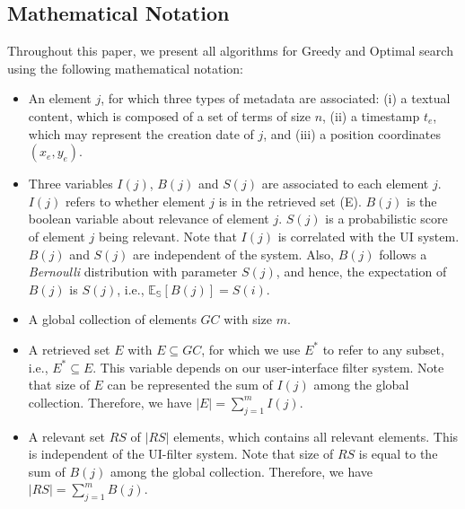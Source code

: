 \subsection{Mathematical Notation}
Throughout this paper, we present all algorithms for Greedy and Optimal search using the following mathematical notation:

\begin{itemize}
\item An element $j$, for which three types of metadata are associated: (i) a textual content, which is composed of a set of terms of size $n$, (ii) a timestamp $t_e$, which may represent the creation date of $j$, and (iii) a position coordinates $(x_{e},y_{e})$.
\item Three variables $I(j)$, $B(j)$ and $S(j)$ are associated to each element $j$. $I(j)$ refers to whether element $j$ is in the retrieved set (E). $B(j)$ is the boolean variable about relevance of element $j$. $S(j)$ is a probabilistic score of  element $j$ being relevant. Note that $I(j)$ is correlated with the UI system. $B(j)$ and $S(j)$ are independent of the system. %
Also, $B(j)$ follows a \emph{Bernoulli} distribution with parameter $S(j)$, and hence, the expectation of $B(j)$ is $S(j)$, i.e., 
  $\mathbb{E_S}[B(j)] = S(i)$.





\item A global collection of elements $GC$ with size $m$. %
\item A retrieved set $E$ with $E \subseteq  GC$, for which we use $E^*$ to refer to any subset, i.e., $E^*\subseteq E$. This variable depends on our user-interface filter system. Note that size of $E$ can be represented the sum of $I(j)$ among the global collection. Therefore, we have $|E| = \sum_{j=1}^m I(j)$.
\item A relevant set $RS$ of $|RS|$ elements, which contains all relevant elements. This is independent of the UI-filter system. Note that size of $RS$ is equal to the sum of $B(j)$ among the global collection. Therefore, we have $|RS| = \sum_{j=1}^m B(j)$. %


\end{itemize}

